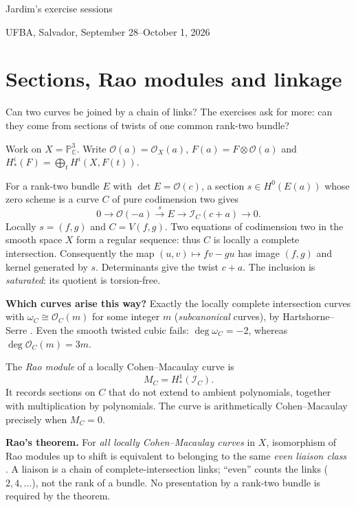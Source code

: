 \documentclass[11pt,a4paper]{article}
\begin{document}
\thispagestyle{plain}
\begin{center}
{\Large Jardim's exercise sessions}\par
\small UFBA, Salvador,
September 28--October 1, 2026
\end{center}

\section{Sections, Rao modules and linkage}

Can two curves be joined by a chain
of links? The exercises ask for more:
can they come from sections of twists
of one common rank-two bundle?

Work on $X=\mathbb{P}^3_{\mathbb{C}}$.
Write $\mathcal{O}(a)=\mathcal{O}_X(a)$,
$F(a)=F\otimes\mathcal{O}(a)$ and
$H^i_*(F)=\bigoplus_t H^i(X,F(t))$.

For a rank-two bundle $E$ with
$\det E=\mathcal{O}(c)$, a section
$s\in H^0(E(a))$ whose zero scheme is
a curve $C$ of pure codimension two gives
\begin{equation}
0\longrightarrow\mathcal{O}(-a)
\xrightarrow{s}E
\longrightarrow\mathcal{I}_C(c+a)
\longrightarrow0.
\label{eq-section}
\end{equation}
Locally $s=(f,g)$ and $C=V(f,g)$.
Two equations of codimension two in
the smooth space $X$ form a regular
sequence: thus $C$ is locally a complete
intersection. Consequently the map
$(u,v)\mapsto fv-gu$ has image $(f,g)$
and kernel generated by $s$.
Determinants give the twist $c+a$.
The inclusion is \emph{saturated}:
its quotient is torsion-free.

\textbf{Which curves arise this way?}
Exactly the locally complete intersection
curves with $\omega_C\cong\mathcal{O}_C(m)$
for some integer $m$ (\emph{subcanonical}
curves), by Hartshorne--Serre
\cite{serre}.
Even the smooth twisted cubic fails:
$\deg\omega_C=-2$, whereas
$\deg\mathcal{O}_C(m)=3m$.

The \emph{Rao module} of a locally
Cohen--Macaulay curve is
$$
M_C=H^1_*(\mathcal{I}_C).
$$
It records sections on $C$ that do not
extend to ambient polynomials, together
with multiplication by polynomials.
The curve is arithmetically
Cohen--Macaulay precisely when $M_C=0$.

\textbf{Rao's theorem.}
For \emph{all locally Cohen--Macaulay
curves} in $X$, isomorphism of Rao modules
up to shift is equivalent to belonging
to the same \emph{even liaison class}
\cite{rao}.
A liaison is a chain of
complete-intersection links; ``even''
counts the links ($2,4,\ldots$), not
the rank of a bundle.
No presentation by a rank-two bundle
is required by the theorem.
\end{document}
